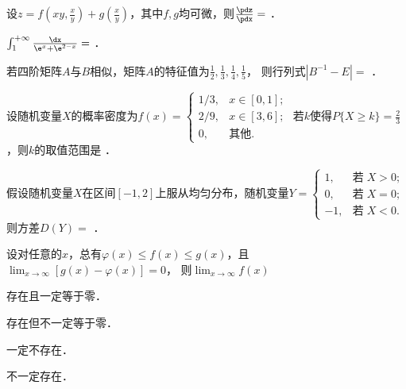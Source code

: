 \documentclass[plain,noanswer,medmath]{../../template/jnuexam}
\begin{document}






\begin{problem}
设$z = f\left(xy,\frac{x}{y} \right) + g\left(\frac{x}{y} \right)$，其中$f,g$均可微，则$\frac{\pdz}{\pdx} =$ \fillin{}．
\end{problem}


\begin{problem}
$\int_1^{+\infty} \frac{\dx}{\e^x + \e^{2 - x}} =$ \fillin{}．
\end{problem}


\begin{problem}
若四阶矩阵$A$与$B$相似，矩阵$A$的特征值为$\frac{1}{2},\frac{1}{3},\frac{1}{4},\frac{1}{5}$，
则行列式$\left|B^{-1}-E\right|=$ \fillin{}．
\end{problem}


\begin{problem}
设随机变量$X$的概率密度为$f(x) = \begin{cases}
  1/3, & x \in[0,1]; \\
  2/9, & x \in[3,6]; \\
    0, & \text{其他}.
\end{cases}$ 若$k$使得$P\{X \ge k\} = \frac{2}{3}$，则$k$的取值范围是 \fillin{}．
\end{problem}


\begin{problem}
假设随机变量$X$在区间$[- 1,2]$上服从均匀分布，随机变量$Y = \begin{cases}
   1, & \text{若}\;X > 0; \\
   0, & \text{若}\;X = 0; \\
  -1, & \text{若}\;X < 0.
\end{cases}$
则方差$D(Y) =$ \fillin{}．
\end{problem}




\begin{problem}
设对任意的$x$，总有$\varphi (x) \le f(x) \le g(x)$，且$\lim_{x \to \infty} \left[g(x) - \varphi(x) \right] = 0$，
则$\lim_{x \to \infty} f(x)$ \pickout{}
\begin{abcd}
\item 存在且一定等于零．
\item 存在但不一定等于零．
\item 一定不存在．
\item 不一定存在．
\end{abcd}
\end{problem}
\end{document}
